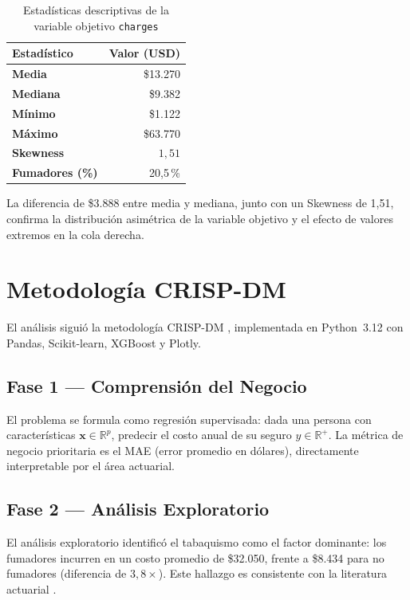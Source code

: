 \documentclass[12pt, a4paper]{article}
\begin{document}
\begin{table}[H]
\centering
\caption{Estadísticas descriptivas de la variable objetivo \texttt{charges}}
\begin{tabular}{>{\bfseries}p{4cm} r}
\toprule
Estadístico & Valor (USD) \\
\midrule
Media           & \$13.270 \\
Mediana         & \$9.382 \\
Mínimo          & \$1.122 \\
Máximo          & \$63.770 \\
Skewness        & $1{,}51$ \\
\midrule
Fumadores (\%) & 20{,}5\,\% \\
\bottomrule
\end{tabular}
\label{tab:desc_charges}
\end{table}

La diferencia de \$3.888 entre media y mediana, junto con un Skewness
de 1{,}51, confirma la distribución asimétrica de la variable objetivo
y el efecto de valores extremos en la cola derecha.

\section{Metodología CRISP-DM}

El análisis siguió la metodología CRISP-DM \cite{wirth2000crisp},
implementada en Python~3.12 con Pandas, Scikit-learn, XGBoost y Plotly.

\subsection{Fase 1 — Comprensión del Negocio}

El problema se formula como regresión supervisada: dada una persona con
características $\mathbf{x} \in \mathbb{R}^p$, predecir el costo anual
de su seguro $y \in \mathbb{R}^+$. La métrica de negocio prioritaria es
el MAE (error promedio en dólares), directamente interpretable por el
área actuarial.

\subsection{Fase 2 — Análisis Exploratorio}

El análisis exploratorio identificó el tabaquismo como el factor dominante:
los fumadores incurren en un costo promedio de \$32.050, frente a \$8.434
para no fumadores (diferencia de $3{,}8\times$). Este hallazgo es
consistente con la literatura actuarial \cite{duan2021prediction}.
\end{document}
